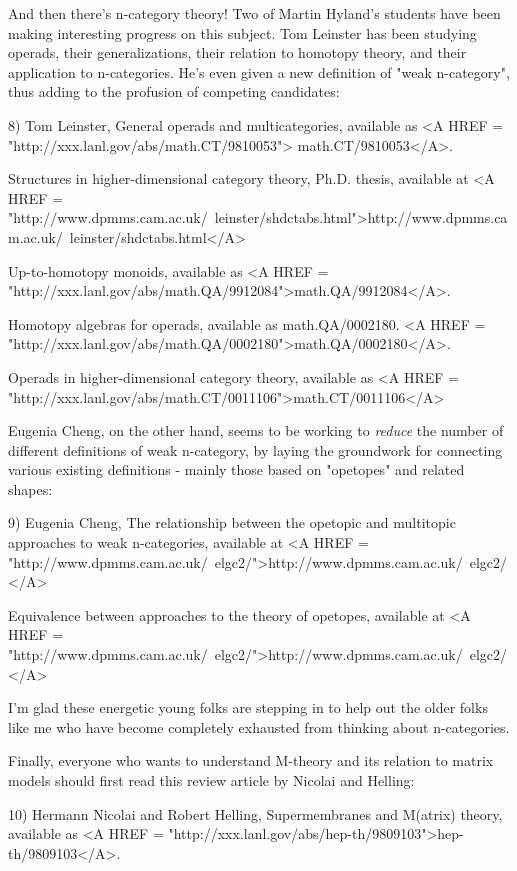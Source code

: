 And then there's n-category theory!  Two of Martin Hyland's students
have been making interesting progress on this subject.  Tom Leinster has
been studying operads, their generalizations, their relation to homotopy
theory, and their application to n-categories.  He's even given a new
definition of "weak n-category", thus adding to the profusion of competing
candidates:

8) Tom Leinster, General operads and multicategories, available as
<A HREF = "http://xxx.lanl.gov/abs/math.CT/9810053">
math.CT/9810053</A>.

Structures in higher-dimensional category theory, Ph.D. thesis, 
available at <A HREF = "http://www.dpmms.cam.ac.uk/~leinster/shdctabs.html">http://www.dpmms.cam.ac.uk/~leinster/shdctabs.html</A>

Up-to-homotopy monoids, available as 
<A HREF = "http://xxx.lanl.gov/abs/math.QA/9912084">math.QA/9912084</A>.

Homotopy algebras for operads, available as math.QA/0002180.
<A HREF = "http://xxx.lanl.gov/abs/math.QA/0002180">math.QA/0002180</A>.

Operads in higher-dimensional category theory, 
available as 
<A HREF = "http://xxx.lanl.gov/abs/math.CT/0011106">math.CT/0011106</A>

Eugenia Cheng, on the other hand, seems to be working to \emph{reduce} the
number of different definitions of weak n-category, by laying the
groundwork for connecting various existing definitions - mainly those
based on "opetopes" and related shapes:

9) Eugenia Cheng, The relationship between the opetopic and 
multitopic approaches to weak n-categories, available at 
<A HREF = "http://www.dpmms.cam.ac.uk/~elgc2/">http://www.dpmms.cam.ac.uk/~elgc2/</A>

Equivalence between approaches to the theory of opetopes, available
at <A HREF = "http://www.dpmms.cam.ac.uk/~elgc2/">http://www.dpmms.cam.ac.uk/~elgc2/</A>

I'm glad these energetic young folks are stepping in to help out
the older folks like me who have become completely exhausted from 
thinking about n-categories.  

Finally, everyone who wants to understand M-theory and its relation 
to matrix models should first read this review article by Nicolai 
and Helling:

10) Hermann Nicolai and Robert Helling, Supermembranes and
M(atrix) theory, available as <A HREF = "http://xxx.lanl.gov/abs/hep-th/9809103">hep-th/9809103</A>. 

